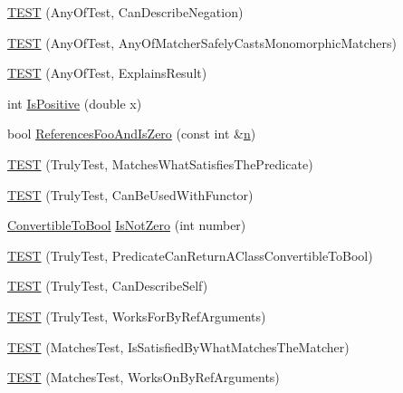 \begin{DoxyCompactItemize}
\item 
\hyperlink{namespacetesting_1_1gmock__matchers__test_acc5e849e0765f00a48581e9480f3c8e2}{T\+E\+ST} (Any\+Of\+Test, Can\+Describe\+Negation)
\item 
\hyperlink{namespacetesting_1_1gmock__matchers__test_a8fb1598253450afeb0440682cd23999e}{T\+E\+ST} (Any\+Of\+Test, Any\+Of\+Matcher\+Safely\+Casts\+Monomorphic\+Matchers)
\item 
\hyperlink{namespacetesting_1_1gmock__matchers__test_ad4c09014fce6029575e2c337cde85bdf}{T\+E\+ST} (Any\+Of\+Test, Explains\+Result)
\item 
int \hyperlink{namespacetesting_1_1gmock__matchers__test_a70e728cf67d0224c3ebb9eb8959cc39d}{Is\+Positive} (double x)
\item 
bool \hyperlink{namespacetesting_1_1gmock__matchers__test_abdce9daf2e3d3721d68f76680129f03b}{References\+Foo\+And\+Is\+Zero} (const int \&\hyperlink{app_2main_8cpp_acfc02ec89670db29251fda6a66602ce2}{n})
\item 
\hyperlink{namespacetesting_1_1gmock__matchers__test_ab7761562a8ffea67a485f3f649f6430a}{T\+E\+ST} (Truly\+Test, Matches\+What\+Satisfies\+The\+Predicate)
\item 
\hyperlink{namespacetesting_1_1gmock__matchers__test_ab3e259f3ae45e199474d7c6d554852f0}{T\+E\+ST} (Truly\+Test, Can\+Be\+Used\+With\+Functor)
\item 
\hyperlink{classtesting_1_1gmock__matchers__test_1_1ConvertibleToBool}{Convertible\+To\+Bool} \hyperlink{namespacetesting_1_1gmock__matchers__test_a248045bc57c8bad87b7d185b5c292f60}{Is\+Not\+Zero} (int number)
\item 
\hyperlink{namespacetesting_1_1gmock__matchers__test_a24529fd7834d272009af74106422fe54}{T\+E\+ST} (Truly\+Test, Predicate\+Can\+Return\+A\+Class\+Convertible\+To\+Bool)
\item 
\hyperlink{namespacetesting_1_1gmock__matchers__test_af474a9719e614d521c71bdf7c39f6a7a}{T\+E\+ST} (Truly\+Test, Can\+Describe\+Self)
\item 
\hyperlink{namespacetesting_1_1gmock__matchers__test_ae702d436c52bd37fe3e8d405d7e6a691}{T\+E\+ST} (Truly\+Test, Works\+For\+By\+Ref\+Arguments)
\item 
\hyperlink{namespacetesting_1_1gmock__matchers__test_a6617484cbb644af9882fc5d853112aae}{T\+E\+ST} (Matches\+Test, Is\+Satisfied\+By\+What\+Matches\+The\+Matcher)
\item 
\hyperlink{namespacetesting_1_1gmock__matchers__test_a6cfa391c9035262ccdc0d8f59e037b4d}{T\+E\+ST} (Matches\+Test, Works\+On\+By\+Ref\+Arguments)

\end{DoxyCompactItemize}

